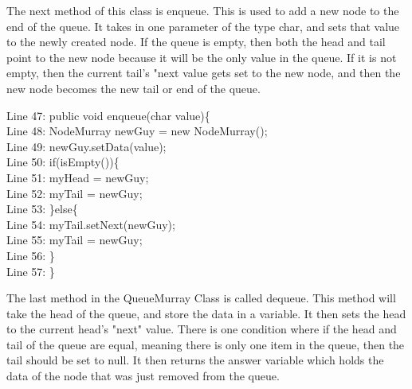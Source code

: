\documentclass{article}
\begin{document}
\noindent
The next method of this class is enqueue. This is used to add a new node to the end of the queue. It takes in one parameter of the type char, and sets that value to the newly created node. If the queue is empty, then both the head and tail point to the new node because it will be the only value in the queue. If it is not empty, then the current tail's "next value gets set to the new node, and then the new node becomes the new tail or end of the queue. 

\vspace{2em}
Line 47: public void enqueue(char value)\{\\
    \hspace*{1.5em}Line 48: \hspace*{1em}NodeMurray newGuy = new NodeMurray();\\
    \hspace*{1.5em}Line 49: \hspace*{1em}newGuy.setData(value);\\
    \hspace*{1.5em}Line 50:  \hspace*{1em}if(isEmpty())\{\\
	\hspace*{1.5em}Line 51:  \hspace*{2em}myHead = newGuy;\\
    \hspace*{1.5em}Line 52: \hspace*{2em}myTail = newGuy;\\
    \hspace*{1.5em}Line 53: \hspace*{1em}\}else\{\\
    \hspace*{1.5em}Line 54: \hspace*{2em} myTail.setNext(newGuy);\\
    \hspace*{1.5em}Line 55:  \hspace*{2em} myTail = newGuy;\\
    \hspace*{1.5em}Line 56:\hspace*{1em} \}\\
    \hspace*{1.5em}Line 57: \}\\
\vspace{2em}

\noindent
The last method in the QueueMurray Class is called dequeue. This method will take the head of the queue, and store the data in a variable. It then sets the head to the current head's "next" value. There is one condition where if the head and tail of the queue are equal, meaning there is only one item in the queue, then the tail should be set to null. It then returns the answer variable which holds the data of the node that was just removed from the queue.
\end{document}
